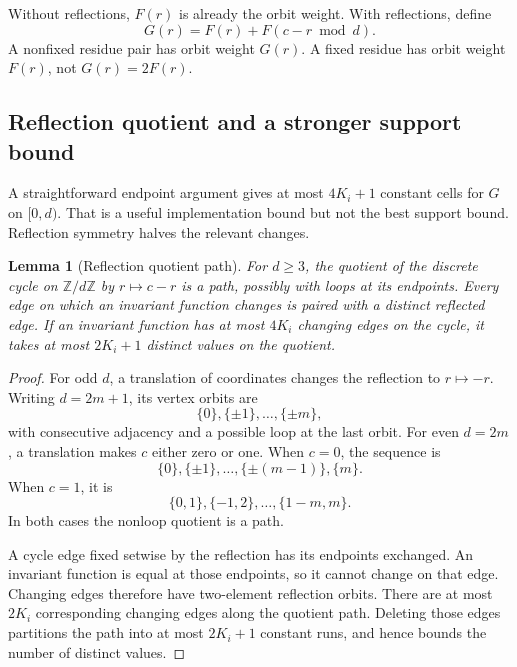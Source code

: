 \documentclass[11pt]{article}
\newtheorem{lemma}[theorem]{Lemma}
\theoremstyle{definition}
\newcommand{\Z}{\mathbb Z}
\begin{document}
Without reflections, $F(r)$ is already the orbit weight. With reflections, define
\begin{equation}
 G(r)=F(r)+F(c-r\bmod d).
 \label{eq:G}
\end{equation}
A nonfixed residue pair has orbit weight $G(r)$. A fixed residue has orbit weight $F(r)$, not $G(r)=2F(r)$.

\subsection{Reflection quotient and a stronger support bound}
A straightforward endpoint argument gives at most $4K_i+1$ constant cells for $G$ on $[0,d)$. That is a useful implementation bound but not the best support bound. Reflection symmetry halves the relevant changes.

\begin{lemma}[Reflection quotient path]
\label{lem:quotientpath}
For $d\ge3$, the quotient of the discrete cycle on $\Z/d\Z$ by $r\mapsto c-r$ is a path, possibly with loops at its endpoints. Every edge on which an invariant function changes is paired with a distinct reflected edge. If an invariant function has at most $4K_i$ changing edges on the cycle, it takes at most $2K_i+1$ distinct values on the quotient.
\end{lemma}
\begin{proof}
For odd $d$, a translation of coordinates changes the reflection to $r\mapsto-r$. Writing $d=2m+1$, its vertex orbits are
\[
 \{0\},\{\pm1\},\ldots,\{\pm m\},
\]
with consecutive adjacency and a possible loop at the last orbit. For even $d=2m$, a translation makes $c$ either zero or one. When $c=0$, the sequence is
\[
 \{0\},\{\pm1\},\ldots,\{\pm(m-1)\},\{m\}.
\]
When $c=1$, it is
\[
 \{0,1\},\{-1,2\},\ldots,\{1-m,m\}.
\]
In both cases the nonloop quotient is a path.

A cycle edge fixed setwise by the reflection has its endpoints exchanged. An invariant function is equal at those endpoints, so it cannot change on that edge. Changing edges therefore have two-element reflection orbits. There are at most $2K_i$ corresponding changing edges along the quotient path. Deleting those edges partitions the path into at most $2K_i+1$ constant runs, and hence bounds the number of distinct values.
\end{proof}
\end{document}
